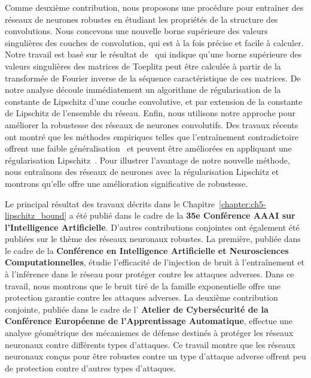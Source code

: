 Comme deuxième contribution, nous proposons une procédure pour entraîner des réseaux de neurones robustes en étudiant les propriétés de la structure des convolutions.
Nous concevons une nouvelle borne supérieure des valeurs singulières des couches de convolution, qui est à la fois précise et facile à calculer.
Notre travail est basé sur le résultat de~\citet{gray2006toeplitz} qui indique qu'une borne supérieure des valeurs singulières des matrices de Toeplitz peut être calculée à partir de la transformée de Fourier inverse de la séquence caractéristique de ces matrices.
De notre analyse découle immédiatement un algorithme de régularisation de la constante de Lipschitz d'une couche convolutive, et par extension de la constante de Lipschitz de l'ensemble du réseau.
Enfin, nous utilisons notre approche pour améliorer la robustesse des réseaux de neurones convolutifs.
Des travaux récents ont montré que les méthodes empiriques telles que l'entraînement contradictoire offrent une faible généralisation~\cite{schmidt2018adversarially} et peuvent être améliorées en appliquant une régularisation Lipschitz~\cite{farnia2018generalizable}.
Pour illustrer l'avantage de notre nouvelle méthode, nous entraînons des réseaux de neurones avec la régularisation Lipschitz et montrons qu'elle offre une amélioration significative de robustesse.

Le principal résultat des travaux décrits dans le Chapitre~\ref{chapter:ch5-lipschitz_bound} a été publié dans le cadre de la  \textbf{\color{mydarkblue}35e Conférence AAAI sur l'Intelligence Artificielle}.
D'autres contributions conjointes ont également été publiées sur le thème des réseaux neuronaux robustes.
La première, publiée dans le cadre de la \textbf{\color{mydarkblue} Conférence en Intelligence Artificielle et Neurosciences Computationnelles}, étudie l'efficacité de l'injection de bruit à l'entraînement et à l'inférence dans le réseau pour protéger contre les attaques adverses.
Dans ce travail, nous montrons que le bruit tiré de la famille exponentielle offre une protection garantie contre les attaques adverses. 
La deuxième contribution conjointe, publiée dans le cadre de l'\textbf{\color{mydarkblue} Atelier de Cybersécurité de la Conférence Européenne de l'Apprentissage Automatique}, effectue une analyse géométrique des mécanismes de défense destinés à protéger les réseaux neuronaux contre différents types d'attaques.
Ce travail montre que les réseaux neuronaux conçus pour être robustes contre un type d'attaque adverse offrent peu de protection contre d'autres types d'attaques.




